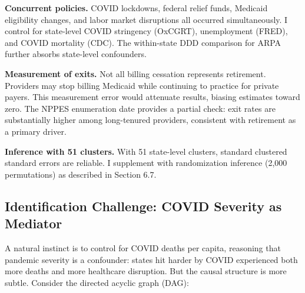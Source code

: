 \documentclass[12pt]{article}
\begin{document}
\textbf{Concurrent policies.} COVID lockdowns, federal relief funds, Medicaid eligibility changes, and labor market disruptions all occurred simultaneously. I control for state-level COVID stringency (OxCGRT), unemployment (FRED), and COVID mortality (CDC). The within-state DDD comparison for ARPA further absorbs state-level confounders.

\textbf{Measurement of exits.} Not all billing cessation represents retirement. Providers may stop billing Medicaid while continuing to practice for private payers. This measurement error would attenuate results, biasing estimates toward zero. The NPPES enumeration date provides a partial check: exit rates are substantially higher among long-tenured providers, consistent with retirement as a primary driver.

\textbf{Inference with 51 clusters.} With 51 state-level clusters, standard clustered standard errors are reliable. I supplement with randomization inference (2,000 permutations) as described in Section 6.7.

\subsection{Identification Challenge: COVID Severity as Mediator}

A natural instinct is to control for COVID deaths per capita, reasoning that pandemic severity is a confounder: states hit harder by COVID experienced both more deaths and more healthcare disruption. But the causal structure is more subtle. Consider the directed acyclic graph (DAG):

\begin{center}
\end{center}
\end{document}
